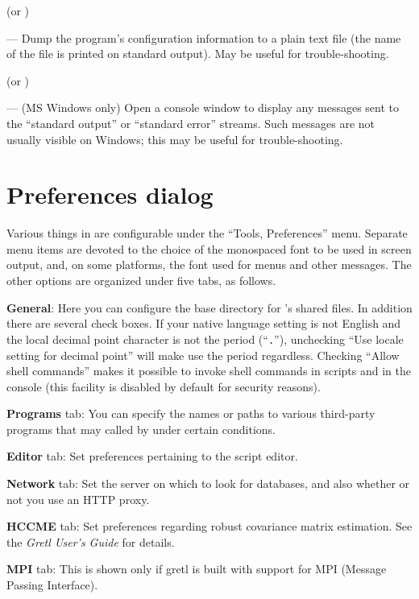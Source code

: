  (or )
      
--- Dump the program's configuration information to a plain text file
(the name of the file is printed on standard output).  May be useful
for trouble-shooting.
      
 (or )

--- (MS Windows only) Open a console window to display any messages
sent to the ``standard output'' or ``standard error'' streams.  Such
messages are not usually visible on Windows; this may be useful for
trouble-shooting.
      
\section{Preferences dialog}
\label{guiprefs}

Various things in  are configurable under the ``Tools,
Preferences'' menu.  Separate menu items are devoted to the choice of
the monospaced font to be used in  screen output, and, on
some platforms, the font used for menus and other messages.  The other
options are organized under five tabs, as follows.
      
\textbf{General}: Here you can configure the base directory for
's shared files. In addition there are several check
boxes. If your native language setting is not English and the local
decimal point character is not the period (``\texttt{.}''), unchecking
``Use locale setting for decimal point'' will make  use the
period regardless.  Checking ``Allow shell commands'' makes it
possible to invoke shell commands in scripts and in the 
console (this facility is disabled by default for security reasons).
      
\textbf{Programs} tab: You can specify the names or paths to various
third-party programs that may called by  under certain
conditions.

\textbf{Editor} tab: Set preferences pertaining to the 
script editor.

\textbf{Network} tab: Set the server on which to look for 
databases, and also whether or not you use an HTTP proxy.
      
\textbf{HCCME} tab: Set preferences regarding robust covariance matrix
estimation.  See the \emph{Gretl User's Guide} for details.
      
\textbf{MPI} tab: This is shown only if gretl is built with support
for MPI (Message Passing Interface).
      
